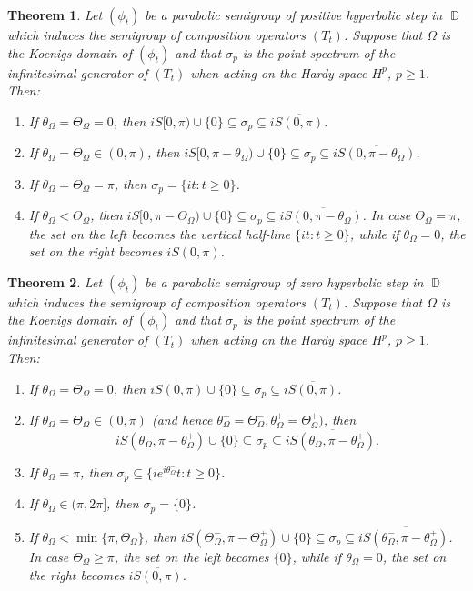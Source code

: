 \documentclass[11pt]{amsart}
\numberwithin{equation}{section}
\newtheorem{theorem}{Theorem}[section]
\theoremstyle{definition}
\DeclareMathOperator{\D}{\mathbb{D}}
\begin{document}
	\begin{theorem}\label{thm:hardy phs}
		Let $(\phi_t)$ be a parabolic semigroup of positive hyperbolic step in $\D$ which induces the semigroup of composition operators $(T_t)$. Suppose that $\Omega$ is the Koenigs domain of $(\phi_t)$ and that $\sigma_p$ is the point spectrum of the infinitesimal generator of $(T_t)$ when acting on the Hardy space $H^p$, $p\ge1$. Then:
		\begin{enumerate}
			\item[\textup{(a)}] If $\theta_\Omega=\Theta_\Omega=0$, then $iS[0,\pi)\cup\{0\}\subseteq\sigma_p\subseteq i\overline{S(0,\pi)}$.
			\item[\textup{(b)}] If $\theta_\Omega=\Theta_\Omega\in(0,\pi)$, then $iS[0,\pi-\theta_\Omega)\cup\{0\}\subseteq \sigma_p \subseteq i\overline{S(0,\pi-\theta_\Omega)}$.
			\item[\textup{(c)}] If $\theta_\Omega=\Theta_\Omega=\pi$, then $\sigma_p=\{it:t\ge0\}$.
			\item[\textup{(d)}] If $\theta_\Omega<\Theta_\Omega$, then $iS[0,\pi-\Theta_\Omega)\cup\{0\}\subseteq\sigma_p\subseteq i\overline{S(0,\pi-\theta_\Omega)}$. In case $\Theta_\Omega=\pi$, the set on the left becomes the vertical half-line $\{it:t\ge0\}$, while if $\theta_\Omega=0$, the set on the right becomes $i\overline{S(0,\pi)}$.
		\end{enumerate}
	\end{theorem}
	
	\begin{theorem}\label{thm:hardy 0hs}
		Let $(\phi_t)$ be a parabolic semigroup of zero hyperbolic step in $\D$ which induces the semigroup of composition operators $(T_t)$. Suppose that $\Omega$ is the Koenigs domain of $(\phi_t)$ and that $\sigma_p$ is the point spectrum of the infinitesimal generator of $(T_t)$ when acting on the Hardy space $H^p$, $p\ge1$. Then:
		\begin{enumerate}
			\item[\textup{(a)}] If $\theta_\Omega=\Theta_\Omega=0$, then $iS(0,\pi)\cup\{0\}\subseteq\sigma_p\subseteq i\overline{S(0,\pi)}$.
			\item[\textup{(b)}] If $\theta_\Omega=\Theta_\Omega\in(0,\pi)$ (and hence $\theta_\Omega^-=\Theta_\Omega^-, \theta_\Omega^+=\Theta_\Omega^+)$, then
			$$iS(\theta_\Omega^-,\pi-\theta_\Omega^+)\cup\{0\}\subseteq \sigma_p \subseteq i\overline{S(\theta_\Omega^-,\pi-\theta_\Omega^+)}.$$
			\item[\textup{(c)}] If $\theta_\Omega=\pi$, then $\sigma_p\subseteq \{ie^{i\theta_\Omega^-}t:t\ge0\}$.
			\item[\textup{(d)}] If $\theta_\Omega\in(\pi,2\pi]$, then $\sigma_p=\{0\}$.
			\item[\textup{(e)}] If $\theta_\Omega<\min\{\pi,\Theta_\Omega\}$, then $iS(\Theta_\Omega^-,\pi-\Theta_\Omega^+)\cup\{0\}\subseteq\sigma_p\subseteq i\overline{S(\theta_\Omega^-,\pi-\theta_\Omega^+)}$. In case $\Theta_\Omega\ge\pi$, the set on the left becomes $\{0\}$, while if $\theta_\Omega=0$, the set on the right becomes $i\overline{S(0,\pi)}$.
		\end{enumerate} 
	\end{theorem}
	
\end{document}
